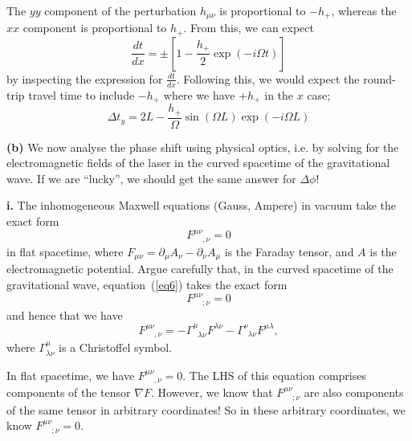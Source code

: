 \documentclass[a4paper]{article} %
\newcommand{\ph}[1]{\phantom{#1}}
\begin{document}
The $yy$ component of the perturbation $h_{\mu\nu}$ is proportional to $-h_+$, whereas the $xx$ component is proportional to $h_+$. From this, we can expect
\begin{equation}
\frac{dt}{dx}=\pm\left[1-\frac{h_+}{2}\exp(-i\Omega t)\right]
\end{equation}
by inspecting the expression for $\frac{dt}{dx}$. Following this, we would expect the round-trip travel time to include $-h_+$ where we have $+h_+$ in the $x$ case;
\begin{equation}
\Delta t_{y} = 2L  - \frac{h_+}{\Omega}\sin(\Omega L)\exp(-i\Omega L)
\end{equation}


\begin{framed}
\textbf{(b)} We now analyse the phase shift using physical optics, i.e. by solving for the electromagnetic fields of the laser in the curved spacetime of the gravitational wave. If we are ``lucky'',  we should get the same answer for $\Delta \phi$!
\end{framed}

\begin{framed}
\textbf{i.} The inhomogeneous Maxwell equations (Gauss, Ampere) in vacuum take the exact form
\begin{equation}
F^{\mu\nu}_{\ph{\mu\nu},\nu}=0 \label{eq6}
\end{equation}
in flat spacetime, where $F_{\mu\nu}=\partial_{\mu} A_{\nu} - \partial_{\nu} A_{\mu}$ is the Faraday tensor, and $A$ is the electromagnetic potential. Argue carefully that, in the curved spacetime of the gravitational wave, equation~(\ref{eq6}) takes the exact form
\begin{equation}
F^{\mu\nu}_{\ph{\mu\nu};\nu}=0
\end{equation}
and hence that we have
\begin{equation}
F^{\mu\nu}_{\ph{\mu\nu},\nu}=-\Gamma^{\mu}_{\ph{\mu}\lambda\nu} F^{\lambda\nu} - \Gamma^{\nu}_{\ph{\nu}\lambda\nu}
F^{\mu\lambda},\label{eq8}
\end{equation}
where $\Gamma^{\mu}_{\lambda\nu}$ is a Christoffel symbol.
\end{framed}

In flat spacetime, we have $F^{\mu\nu}_{\ph{\mu\nu},\nu}=0$. The LHS of this equation comprises components of the tensor $\nabla F$. However, we know that $F^{\mu\nu}_{\ph{\mu\nu};\nu}$ are also components of the same tensor in arbitrary coordinates! So in these arbitrary coordinates, we know $F^{\mu\nu}_{\ph{\mu\nu};\nu}=0$. 
\end{document}
